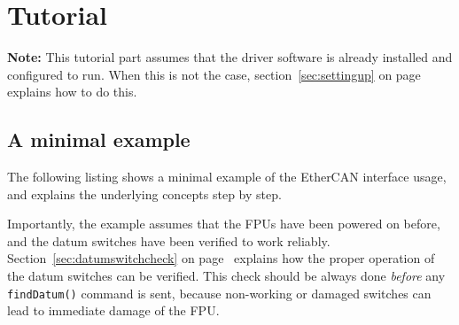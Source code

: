\documentclass[fontsize=12,a4paper]{scrreprt}
\begin{document}
\part{Tutorial}

\textbf{Note:} This tutorial part assumes that the driver software is
already installed and configured to run. When this is not the case,
section~\ref{sec:settingup} on page~\pageref{sec:settingup} explains
how to do this.


\chapter{A minimal example}
\label{sec:minimalexample}
  
 
 

\minitoc


The following listing shows a minimal example of the EtherCAN
interface usage, and explains the underlying concepts step by step.

Importantly, the example assumes that the FPUs have been powered on
before, and the datum switches have been verified to work
reliably. Section~\ref{sec:datumswitchcheck} on
page~\pageref{sec:datumswitchcheck} explains how the proper operation
of the datum switches can be verified. This check should be always
done \emph{before} any \texttt{findDatum()} command is sent, because
non-working or damaged switches can lead to immediate damage of the
FPU.
\end{document}
